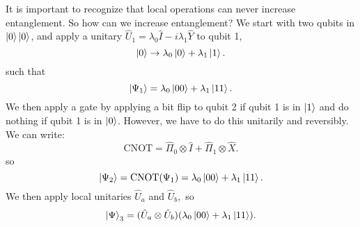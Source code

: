 \documentclass{article}
\numberwithin{equation}{section}
\begin{document}
It is important to recognize that local operations can never increase entanglement. So how can we increase entanglement? We start with two qubits in $\ket 0 \ket 0$, and apply a unitary $\hat{U}_1 = \lambda_0 \hat{I} -i\lambda_1 \hat{Y}$ to qubit 1,
\begin{equation}
    \ket 0 \rightarrow \lambda_0\ket 0 + \lambda_1\ket 1.
\end{equation}
such that 
\begin{equation}
    \ket{\Psi_1} = \lambda_0\ket{00} + \lambda_1\ket{11}.
\end{equation}
We then apply a  gate by applying a bit flip to qubit 2 if qubit 1 is in $\ket 1$ and do nothing if qubit 1 is in $\ket 0$. However, we have to do this unitarily and reversibly. We can write:
\begin{equation}
    \text{CNOT} = \hat{\Pi}_0 \otimes \hat{I} + \hat{\Pi}_1 \otimes \hat{X}.
\end{equation}
so 
\begin{equation}
    \ket{\Psi_2} = \text{CNOT}(\Psi_1) = \lambda_0\ket{00} + \lambda_1\ket{11}. 
\end{equation}
We then apply local unitaries $\hat{U}_a$ and $\hat{U}_b,$ so 
\begin{equation}
    \ket\Psi_3 = (\hat{U}_a \otimes \hat{U}_b) (\lambda_0\ket{00} + \lambda_1\ket{11}).
\end{equation}
\end{document}
